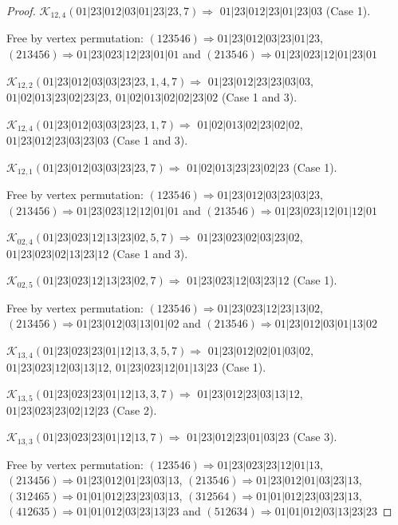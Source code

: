 \documentclass[12pt]{article}
\theoremstyle{plain}
\theoremstyle{definition}
\theoremstyle{remark}
\newcommand{\fancy}[1]{\mathcal{#1}}
\def\K{\fancy{K}}
\begin{document}
\begin{proof}
	$\K_{12,4}(01|23|012|03|01|23|23,7)\Rightarrow $ $01|23|012|23|01|23|03$ (Case 1).
	
	
	
	Free by vertex permutation: $(1 2 3 5 4 6)\Rightarrow 01|23|012|03|23|01|23$, $(2 1 3 4 5 6)\Rightarrow 01|23|023|12|23|01|01$ and $(2 1 3 5 4 6)\Rightarrow 01|23|023|12|01|23|01$
	
	
	
	\bigskip
	
	$\K_{12,2}(01|23|012|03|03|23|23,1, 4, 7)\Rightarrow $ $01|23|012|23|23|03|03$, $01|02|013|23|02|23|23$, $01|02|013|02|02|23|02$ (Case 1 and 3).
	
	$\K_{12,4}(01|23|012|03|03|23|23,1, 7)\Rightarrow $ $01|02|013|02|23|02|02$, $01|23|012|23|03|23|03$ (Case 1 and 3).
	
	$\K_{12,1}(01|23|012|03|03|23|23,7)\Rightarrow $ $01|02|013|23|23|02|23$ (Case 1).
	
	
	
	Free by vertex permutation: $(1 2 3 5 4 6)\Rightarrow 01|23|012|03|23|03|23$, $(2 1 3 4 5 6)\Rightarrow 01|23|023|12|12|01|01$ and $(2 1 3 5 4 6)\Rightarrow 01|23|023|12|01|12|01$
	
	
	
	\bigskip
	
	$\K_{02,4}(01|23|023|12|13|23|02,5, 7)\Rightarrow $ $01|23|023|02|03|23|02$, $01|23|023|02|13|23|12$ (Case 1 and 3).
	
	$\K_{02,5}(01|23|023|12|13|23|02,7)\Rightarrow $ $01|23|023|12|03|23|12$ (Case 1).
	
	
	
	Free by vertex permutation: $(1 2 3 5 4 6)\Rightarrow 01|23|023|12|23|13|02$, $(2 1 3 4 5 6)\Rightarrow 01|23|012|03|13|01|02$ and $(2 1 3 5 4 6)\Rightarrow 01|23|012|03|01|13|02$
	
	
	
	\bigskip
	
	$\K_{13,4}(01|23|023|23|01|12|13,3, 5, 7)\Rightarrow $ $01|23|012|02|01|03|02$, $01|23|023|12|03|13|12$, $01|23|023|12|01|13|23$ (Case 1).
	
	$\K_{13,5}(01|23|023|23|01|12|13,3, 7)\Rightarrow $ $01|23|012|23|03|13|12$, $01|23|023|23|02|12|23$ (Case 2).
	
	$\K_{13,3}(01|23|023|23|01|12|13,7)\Rightarrow $ $01|23|012|23|01|03|23$ (Case 3).
	
	
	
	Free by vertex permutation: $(1 2 3 5 4 6)\Rightarrow 01|23|023|23|12|01|13$, $(2 1 3 4 5 6)\Rightarrow 01|23|012|01|23|03|13$, $(2 1 3 5 4 6)\Rightarrow 01|23|012|01|03|23|13$, $(3 1 2 4 6 5)\Rightarrow 01|01|012|23|23|03|13$, $(3 1 2 5 6 4)\Rightarrow 01|01|012|23|03|23|13$, $(4 1 2 6 3 5)\Rightarrow 01|01|012|03|23|13|23$ and $(5 1 2 6 3 4)\Rightarrow 01|01|012|03|13|23|23$
	

\end{proof}
\end{document}
